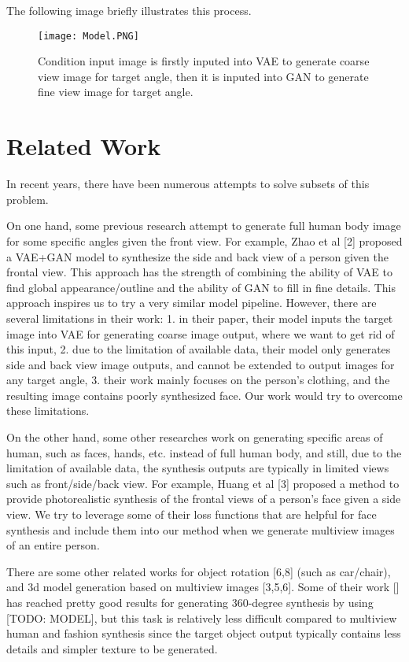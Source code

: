 \documentclass[10pt,conference]{IEEEtran}
\begin{document}
The following image briefly illustrates this process.

\begin{figure}[htbp]
\centering
\texttt{[image: Model.PNG]}
\caption{Condition input image is firstly inputed into VAE to generate coarse view image for target angle, then it is inputed into GAN to generate fine view image for target angle.}
\end{figure}


\section{Related Work}
In recent years, there have been numerous attempts to solve subsets of this problem. 

On one hand, some previous research attempt to generate full human body image for some specific angles given the front view. For example, Zhao et al [2] proposed a VAE+GAN model to synthesize the side and back view of a person given the frontal view. This approach has the strength of combining the ability of VAE to find global appearance/outline and the ability of GAN to fill in fine details. This approach inspires us to try a very similar model pipeline. However, there are several limitations in their work: 1. in their paper, their model inputs the target image into VAE for generating coarse image output, where we want to get rid of this input, 2. due to the limitation of available data, their model only generates side and back view image outputs, and cannot be extended to output images for any target angle, 3. their work mainly focuses on the person’s clothing, and the resulting image contains poorly synthesized face. Our work would try to overcome these limitations.

On the other hand, some other researches work on generating specific areas of human, such as faces, hands, etc. instead of full human body, and still, due to the limitation of available data, the synthesis outputs are typically in limited views such as front/side/back view. For example, Huang et al [3] proposed a method to provide photorealistic synthesis of the frontal views of a person’s face given a side view. We try to leverage some of their loss functions that are helpful for face synthesis and include them into our method when we generate multiview images of an entire person.

There are some other related works for object rotation [6,8] (such as car/chair), and 3d model generation based on multiview images [3,5,6]. Some of their work [] has reached pretty good results for generating 360-degree synthesis by using [TODO: MODEL], but this task is relatively less difficult compared to multiview human and fashion synthesis since the target object output typically contains less details and simpler texture to be generated. 
\end{document}
